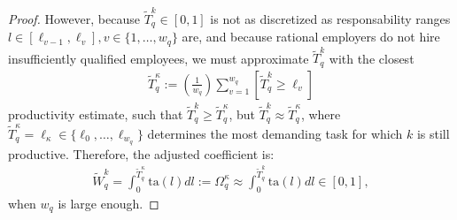 \documentclass[hidelinks, nonatbib]{elsarticle}
\begin{document}
\begin{corollary}
\begin{proof}
        However, because $\tilde{T}_{q}^{k} \in [0,1]$ is not as discretized as responsability ranges $l \in [\ell_{v-1},\ell_{v}], v \in \{1, \dots, w_q\}$ are, and because rational employers do not hire insufficiently qualified employees, we must approximate $\tilde{T}_{q}^{k}$ with the closest 
        \begin{gather}
            \tilde{T}_{q}^{\kappa}
            :=
            \left(
                \frac{1}{w_q}
            \right)
            \sum_{v=1}^{w_q}
            \left[
                \tilde{T}_{q}^{k}
                \geq
                \ell_v
            \right]
        \end{gather}
        productivity estimate, such that $\tilde{T}_{q}^{k} \geq \tilde{T}_{q}^{\kappa}$, but $\tilde{T}_{q}^{k} \approx \tilde{T}_{q}^{\kappa}$, where $
        \tilde{T}_{q}^{\kappa} = \ell_{\kappa} \in \{\ell_0, \dots, \ell_{w_q}\}$ determines the most demanding task for which $k$ is still productive. Therefore, the adjusted coefficient is:
        \begin{gather}
            \tilde{W}_{q}^{k}
            =
            \int_{0}^{\tilde{T}_{q}^{\kappa}}
            \text{ta}(l)
            dl
            :=
            \Omega_{q}^{\kappa}
            \approx
            \int_{0}^{\tilde{T}_{q}^{k}}
            \text{ta}(l)
            dl
            \in 
            [0,1]
            ,
        \end{gather}
        when $w_q$ is large enough.
        

\end{proof}
\end{corollary}
\end{document}
